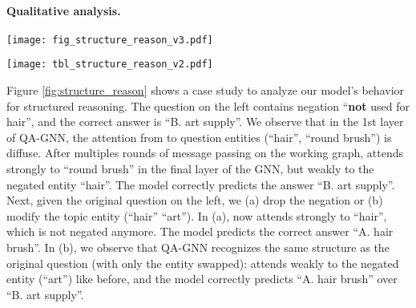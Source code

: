 \documentclass[11pt]{article}
\newcommand{\methodname}{QA-GNN\xspace}
\begin{document}
\paragraph{Qualitative analysis.}
\begin{figure*}[!th]
    \vspace{-5mm}
    \hspace{-1mm}
    \centering \texttt{[image: fig\_structure\_reason\_v3.pdf]}
\vspace{-1mm}
    \caption{\textbf{Analysis of \methodname's behavior for structured reasoning}. Given an original question (left), we modify its negation (middle) or topic entity (right): we find that \methodname adapts attention weights and final predictions accordingly, suggesting its capability to handle structured reasoning.
    }
    \vspace{-2mm}
\label{fig:structure_reason}
\end{figure*}

\begin{table*}[!th]
    \vspace{-0mm}
    \hspace{-1mm}
    \centering \texttt{[image: tbl\_structure\_reason\_v2.pdf]}
    \vspace{-2mm}
    \caption{\textbf{Case study of structured reasoning}, comparing predictions by RoBERTa and our model (RoBERTa + \methodname). Our model correctly handles changes in negation and topic entities.
    }
\label{tbl:structure_reason}
\end{table*}

Figure \ref{fig:structure_reason} shows a case study to analyze our model's behavior for structured reasoning. 
The question on the left contains negation ``\textbf{not} used for hair'', and the correct answer is ``B. art supply''.
We observe that in the 1st layer of QA-GNN, the attention from  to question entities (``hair'', ``round brush'') is diffuse. After multiples rounds of message passing on the working graph,  attends strongly to ``round brush'' in the final layer of the GNN, but weakly to the negated entity ``hair''. The model correctly predicts the answer ``B. art supply''.
Next, given the original question on the left, we (a) drop the negation or (b) modify the topic entity (``hair''  ``art'').
In (a),  now attends strongly to ``hair'', which is not negated anymore. The model predicts the correct answer ``A. hair brush''.
In (b), we observe that QA-GNN recognizes the same structure as the original question (with only the entity swapped):  attends weakly to the negated entity (``art'') like before, and the model correctly predicts ``A. hair brush'' over ``B. art supply''.
\end{document}
